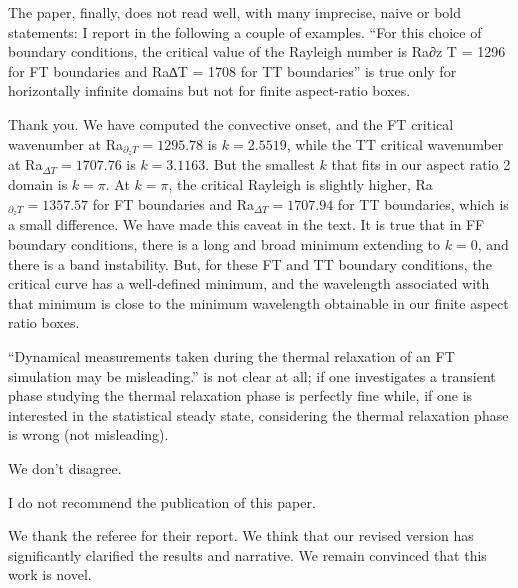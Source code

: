 \documentclass[aps, 11pt, singlecolumn]{revtex4-1} %
\begin{document}
\begin{singlespace}
\begin{myquotation}
The paper, finally, does not read well, with many imprecise, naive or bold statements: I report in the following a couple of examples. 
``For this choice of boundary conditions, the critical value of the Rayleigh number is Ra∂z T = 1296 for FT boundaries and Ra∆T = 1708 for TT boundaries'' is true only for horizontally infinite domains but not for finite aspect-ratio boxes.
\end{myquotation}
Thank you.
We have computed the convective onset, and the FT critical wavenumber at Ra$_{\partial_z T} = 1295.78$ is $k = 2.5519$, while the TT critical wavenumber at Ra$_{\Delta T} = 1707.76$ is $k = 3.1163$.
But the smallest $k$ that fits in our aspect ratio 2 domain is $k = \pi$.
At $k = \pi$, the critical Rayleigh is slightly higher, Ra$_{\partial_z T} = 1357.57$ for FT boundaries and Ra$_{\Delta T} = 1707.94$ for TT boundaries, which is a small difference.
We have made this caveat in the text.
It is true that in FF boundary conditions, there is a long and broad minimum extending to $k = 0$, and there is a band instability.
But, for these FT and TT boundary conditions, the critical curve has a well-defined minimum, and the wavelength associated with that minimum is close to the minimum wavelength obtainable in our finite aspect ratio boxes.

\begin{myquotation}
``Dynamical measurements taken during the thermal relaxation of an FT simulation may be misleading.'' is not clear at all; if one investigates a transient phase studying the thermal relaxation phase is perfectly fine while, if one is interested in the statistical steady state, considering the thermal relaxation phase is wrong (not misleading). 
\end{myquotation}
We don't disagree.

\begin{myquotation}
I do not recommend the publication of this paper.
\end{myquotation}
We thank the referee for their report.
We think that our revised version has significantly clarified the results and narrative.
We remain convinced that this work is novel.


\end{singlespace}





\end{document}
